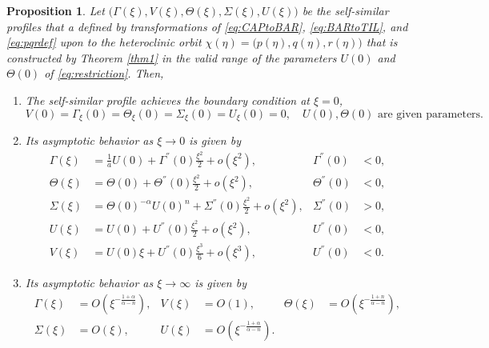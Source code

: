 \documentclass[a4paper,11pt]{article}
\newtheorem{proposition}{Proposition}[section]
\begin{document}
% 
% 
\begin{proposition}
Let $\big(\Gamma(\xi),V(\xi),\Theta(\xi),\Sigma(\xi),U(\xi)\big)$ be the self-similar profiles that a defined by transformations of \eqref{eq:CAPtoBAR}, \eqref{eq:BARtoTIL}, and \eqref{eq:pqrdef} upon to the heteroclinic orbit $\chi(\eta)=\big(p(\eta),q(\eta),r(\eta)\big)$ that is constructed by Theorem \ref{thm1} in the valid range of the parameters $U(0)$ and $\Theta(0)$ of \eqref{eq:restriction}. Then, 
 \begin{enumerate}
  \item[(i)] The self-similar profile achieves the boundary condition at $\xi=0$,
    \begin{equation*}
    {V}(0) = \Gamma_\xi(0) = \Theta_\xi(0)=\Sigma_\xi(0) = {U}_\xi(0)=0, \quad \text{$U(0), \Theta(0)$ are given parameters.}
  \end{equation*}
  \item[(ii)] Its asymptotic behavior as $\xi \rightarrow 0$ is given by 
  \begin{equation} \label{eq:ss_asymp0}
  \begin{aligned}
    \Gamma(\xi) &= \frac{1}{a}U(0) + \Gamma^{''}(0)\frac{\xi^2}{2} + o(\xi^2), & \Gamma^{''}(0)&<0,\\
    \Theta(\xi) &= \Theta(0) + \Theta^{''}(0)\frac{\xi^2}{2} + o(\xi^2), & \Theta^{''}(0)&<0,\\
    \Sigma(\xi) &= \Theta(0)^{-\alpha}{U(0)^n}+ \Sigma^{''}(0)\frac{\xi^2}{2} + o(\xi^2), & \Sigma^{''}(0)&>0, \\
    U(\xi) &= U(0) + U^{''}(0)\frac{\xi^2}{2} + o(\xi^2), & U^{''}(0)&<0,\\
    V(\xi) &= U(0)\xi + U^{''}(0)\frac{\xi^3}{6} + o(\xi^3), & U^{''}(0)&<0.
  \end{aligned}
  \end{equation}
  \item[(iii)] Its asymptotic behavior as $\xi \rightarrow \infty$ is given by
  \begin{equation} \label{eq:ss_asymp1}
  \begin{aligned}
    \Gamma(\xi) &= O(\xi^{-\frac{1+\alpha}{\alpha-n}}), & V(\xi) &= O(1), &    \Theta(\xi) &= O(\xi^{-\frac{1+n}{\alpha-n}}),\\
   \Sigma(\xi) &= O(\xi), &   U(\xi) &= O(\xi^{-\frac{1+\alpha}{\alpha-n}}).
  \end{aligned}
  \end{equation}
 \end{enumerate}
 
\end{proposition}
\end{document}
